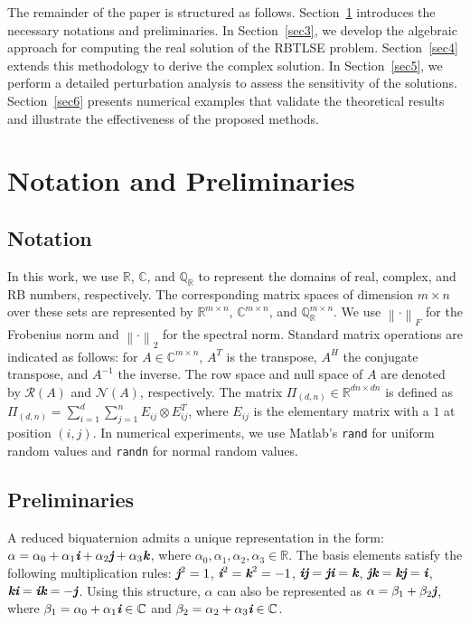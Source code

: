 \documentclass[preprint,11pt,3p]{elsarticle}
\newcommand\norm[1]{\left\lVert#1\right\rVert}
\def \R{{\mathbb R}}
\def \C{{\mathbb C}}
\def \QR{\mathbb{Q}_\mathbb{R}}
\def \i{\textit{\textbf{i}}}
\def \j{\textit{\textbf{j}}}
\def \k{\textit{\textbf{k}}}
\begin{document}
The remainder of the paper is structured as follows. Section~\ref{sec2} introduces the necessary notations and preliminaries. In Section~\ref{sec3}, we develop the algebraic approach for computing the real solution of the RBTLSE problem. Section~\ref{sec4} extends this methodology to derive the complex solution. In Section~\ref{sec5}, we perform a detailed perturbation analysis to assess the sensitivity of the solutions. Section~\ref{sec6} presents numerical examples that validate the theoretical results and illustrate the effectiveness of the proposed methods.

\section{Notation and Preliminaries}\label{sec2}
\subsection{Notation}
In this work, we use \( \R \), \( \C \), and \( \QR \) to represent the domains of real, complex, and RB numbers, respectively. The corresponding matrix spaces of dimension \( m \times n \) over these sets are represented by \( \R^{m \times n} \), \( \C^{m \times n} \), and \( \QR^{m \times n} \). We use $\norm{\cdot}_F$ for the Frobenius norm and $\norm{\cdot}_2$ for the spectral norm. Standard matrix operations are indicated as follows: for $A \in \C^{m \times n}$, $A^T$ is the transpose, $A^H$ the conjugate transpose, and $A^{-1}$ the inverse. The row space and null space of \( A \) are denoted by \( \mathcal{R}(A) \) and \( \mathcal{N}(A) \), respectively. The matrix $\Pi_{(d,n)} \in \mathbb{R}^{dn \times dn}$ is defined as $\Pi_{(d,n)} = \sum_{i=1}^{d} \sum_{j=1}^{n} E_{ij} \otimes E_{ij}^T$, where $E_{ij}$ is the elementary matrix with a $1$ at position $(i,j)$. In numerical experiments, we use Matlab's \texttt{rand} for uniform random values and \texttt{randn} for normal random values.
\subsection{Preliminaries}
A reduced biquaternion admits a unique representation in the form:  $\alpha= \alpha_{0}+ \alpha_{1}\i+ \alpha_{2}\j+ \alpha_{3}\k$,
where $\alpha_{0}, \alpha_1, \alpha_2, \alpha_3 \in \R$. The basis elements satisfy the following multiplication rules: $\j^2= 1$, $\i^2=  \k^2= -1$,
$\i\j= \j\i= \k$, $\j\k= \k\j= \i$, $\k\i= \i\k= -\j$. Using this structure, $\alpha$ can also be represented as $\alpha=\beta_1 +\beta_2\j$, where $\beta_1=\alpha_0 + \alpha_1 \i \in \C$ and $\beta_2=\alpha_2 + \alpha_3\i \in \C$. 
\end{document}
